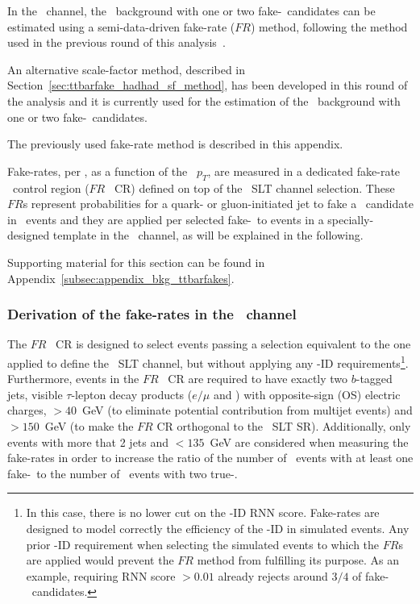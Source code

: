 In the \hadhad\ channel, the \ttbar\ background with one or two fake-\tauhad\ candidates can be estimated using a semi-data-driven fake-rate ($FR$) method, following the method used in the previous round of this analysis~\cite{HIGG-2016-16}.  

An alternative scale-factor method, described in Section~\ref{sec:ttbarfake_hadhad_sf_method}, has been developed in this round of the analysis and it is currently used for the estimation of the \ttbar\ background with one or two fake-\tauhad\ candidates.

The previously used fake-rate method is described in this appendix.

Fake-rates, per \tauhadvis, as a function of the \tauhadvis\ $p_T$, are measured in a dedicated fake-rate \ttbar\ control region ($FR$ \ttbar\ CR) defined on top of the \lephad\ SLT channel selection. These $FR$s represent probabilities for a quark- or gluon-initiated jet to fake a \tauhad\ candidate in \ttbar\ events and they are applied per selected fake-\tauhad\ to events in a specially-designed template in the \hadhad\ channel, as will be explained in the following.

Supporting material for this section can be found in Appendix~\ref{subsec:appendix_bkg_ttbarfakes}.

\subsubsection{Derivation of the fake-rates in the \lephad\ channel}

The $FR$ \ttbar\ CR is designed to select events passing a selection equivalent to the one applied to define the \lephad\ SLT channel, but without applying any \tauhad-ID requirements\footnote{In this case, there is no lower cut on the \tauhad-ID RNN score. Fake-rates are designed to model correctly the efficiency of the \tauhad-ID in simulated events. Any prior \tauhad-ID requirement when selecting the simulated events to which the $FR$s are applied would prevent the $FR$ method from fulfilling its purpose. As an example, requiring RNN score $ > 0.01$ already rejects around $3/4$ of fake-\tauhad\ candidates.}. Furthermore, events in the $FR$ \ttbar\ CR are required to have exactly two $b$-tagged jets, visible $\tau$-lepton decay products ($e/\mu$ and \tauhadvis) with opposite-sign (OS) electric charges, \mtw$ > 40$~GeV (to eliminate potential contribution from multijet events) and \mbb$ >150$~GeV (to make the $FR$ CR orthogonal to the \lephad\ SLT SR). Additionally, only events with more that 2 jets and \mtw$ < 135$~GeV are considered when measuring the fake-rates in order to increase the ratio of the number of \ttbar\ events with at least one fake-\tauhad\ to the number of \ttbar\ events with two true-\tauhad.

